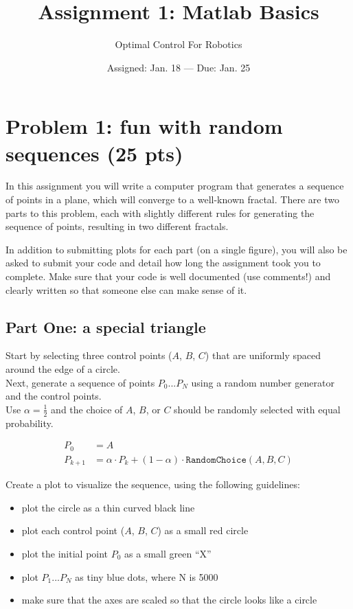 

\title{Assignment 1:  Matlab Basics}
\date{Assigned:  Jan. 18  ---  Due:  Jan. 25}
\author{Optimal Control For Robotics}
\maketitle

\section*{Problem 1: fun with random sequences  (25 pts)}

In this assignment you will write a computer program that generates
a sequence of points in a plane, which will converge to a well-known fractal.
There are two parts to this problem, each with slightly
different rules for generating the sequence of points, resulting in two different fractals.

\par
In addition to submitting plots for each part (on a single figure), you will
also be asked to submit your code and detail how long the assignment took you
to complete. Make sure that your code is well documented (use comments!) and
clearly written so that someone else can make sense of it.

\subsection*{Part One:  a special triangle}
Start by selecting three control points ($A$, $B$, $C$)
that are uniformly spaced around the edge of a circle.\\
Next, generate a sequence of points $P_0 ... P_N$
using a random number generator and the control points. \\
Use $\alpha = \tfrac{1}{2}$ and
the choice of $A$, $B$, or $C$ should be randomly selected with equal probability.

\begin{align}
  P_0 &= A \\
  P_{k+1} &= \alpha \cdot P_k + (1 - \alpha) \cdot \texttt{RandomChoice}(A, B, C)
\end{align}

Create a plot to visualize the sequence, using the following guidelines:
\vspace{-0.3em} \begin{itemize}  \setlength\itemsep{0em}
\item plot the circle as a thin curved black line
\item plot each control point ($A$, $B$, $C$) as a small red circle
\item plot the initial point $P_0$ as a small green ``X''
\item plot $P_1 ... P_N$ as tiny blue dots, where N is 5000
\item make sure that the axes are scaled so that the circle looks like a circle
\end{itemize}

